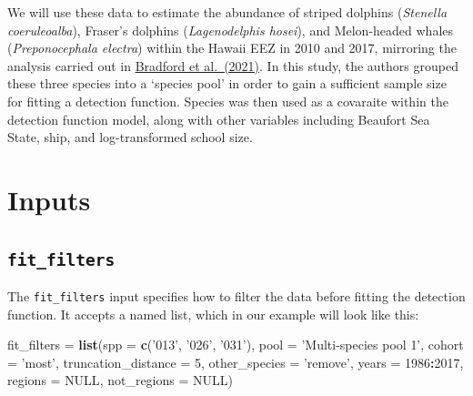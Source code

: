 \documentclass[
]{book}
\newenvironment{Shaded}{\begin{snugshade}}{\end{snugshade}}
\newcommand{\DataTypeTok}[1]{\textcolor[rgb]{0.13,0.29,0.53}{#1}}
\newcommand{\DecValTok}[1]{\textcolor[rgb]{0.00,0.00,0.81}{#1}}
\newcommand{\KeywordTok}[1]{\textcolor[rgb]{0.13,0.29,0.53}{\textbf{#1}}}
\newcommand{\NormalTok}[1]{#1}
\newcommand{\OperatorTok}[1]{\textcolor[rgb]{0.81,0.36,0.00}{\textbf{#1}}}
\newcommand{\OtherTok}[1]{\textcolor[rgb]{0.56,0.35,0.01}{#1}}
\newcommand{\StringTok}[1]{\textcolor[rgb]{0.31,0.60,0.02}{#1}}
\begin{document}
We will use these data to estimate the abundance of striped dolphins (\emph{Stenella coeruleoalba}), Fraser's dolphins (\emph{Lagenodelphis hosei}), and Melon-headed whales (\emph{Preponocephala electra}) within the Hawaii EEZ in 2010 and 2017, mirroring the analysis carried out in \href{https://repository.library.noaa.gov/view/noaa/29004}{Bradford et al.~(2021)}. In this study, the authors grouped these three species into a `species pool' in order to gain a sufficient sample size for fitting a detection function. Species was then used as a covaraite within the detection function model, along with other variables including Beaufort Sea State, ship, and log-transformed school size.

\hypertarget{inputs-1}{%
\section*{Inputs}\label{inputs-1}}

\hypertarget{fit_filters}{%
\subsection*{\texorpdfstring{\texttt{fit\_filters}}{fit\_filters}}\label{fit_filters}}

The \texttt{fit\_filters} input specifies how to filter the data before fitting the detection function. It accepts a named list, which in our example will look like this:

\begin{Shaded}
\begin{Highlighting}[]
\NormalTok{fit_filters =}\StringTok{ }\KeywordTok{list}\NormalTok{(}\DataTypeTok{spp =} \KeywordTok{c}\NormalTok{(}\StringTok{'013'}\NormalTok{, }\StringTok{'026'}\NormalTok{, }\StringTok{'031'}\NormalTok{), }
                   \DataTypeTok{pool =} \StringTok{'Multi-species pool 1'}\NormalTok{,}
                   \DataTypeTok{cohort =} \StringTok{'most'}\NormalTok{,}
                   \DataTypeTok{truncation_distance =} \DecValTok{5}\NormalTok{,}
                   \DataTypeTok{other_species =} \StringTok{'remove'}\NormalTok{,}
                   \DataTypeTok{years =} \DecValTok{1986}\OperatorTok{:}\DecValTok{2017}\NormalTok{,}
                   \DataTypeTok{regions =} \OtherTok{NULL}\NormalTok{,}
                   \DataTypeTok{not_regions =} \OtherTok{NULL}\NormalTok{)}
\end{Highlighting}
\end{Shaded}
\end{document}
